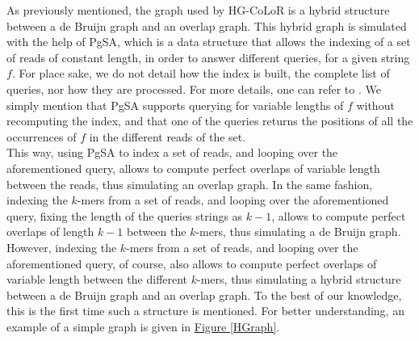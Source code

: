 \documentclass[long, final]{jobim2017}
\begin{document}
As previously mentioned, the graph used by HG-CoLoR is a hybrid structure between a de Bruijn graph and an overlap graph. This hybrid graph is simulated with the help of PgSA, which is a data structure that allows the indexing of a set of reads of constant length, in order to answer different queries, for a given string $f$. For place sake, we do not detail how the index is built, the complete list of queries, nor how they are processed. For more details, one can refer to \cite{Kowalski2015}. We simply mention that PgSA supports querying for variable lengths of $f$ without recomputing the index, and that one of the queries returns the positions of all the occurrences of $f$ in the different reads of the set. \\
\indent This way, using PgSA to index a set of reads, and looping over the aforementioned query, allows to compute perfect overlaps of variable length between the reads, thus simulating an overlap graph. In the same fashion, indexing the $k$-mers from a set of reads, and looping over the aforementioned query, fixing the length of the queries strings as $k-1$, allows to compute perfect overlaps of length $k-1$ between the $k$-mers, thus simulating a de Bruijn graph. However, indexing the $k$-mers from a set of reads, and looping over the aforementioned query, of course, also allows to compute perfect overlaps of variable length between the different $k$-mers, thus simulating a hybrid structure between a de Bruijn graph and an overlap graph. To the best of our knowledge, this is the first time such a structure is mentioned. For better understanding, an example of a simple graph is given in \hyperref[HGraph]{Figure \ref*{HGraph}}.
\end{document}
